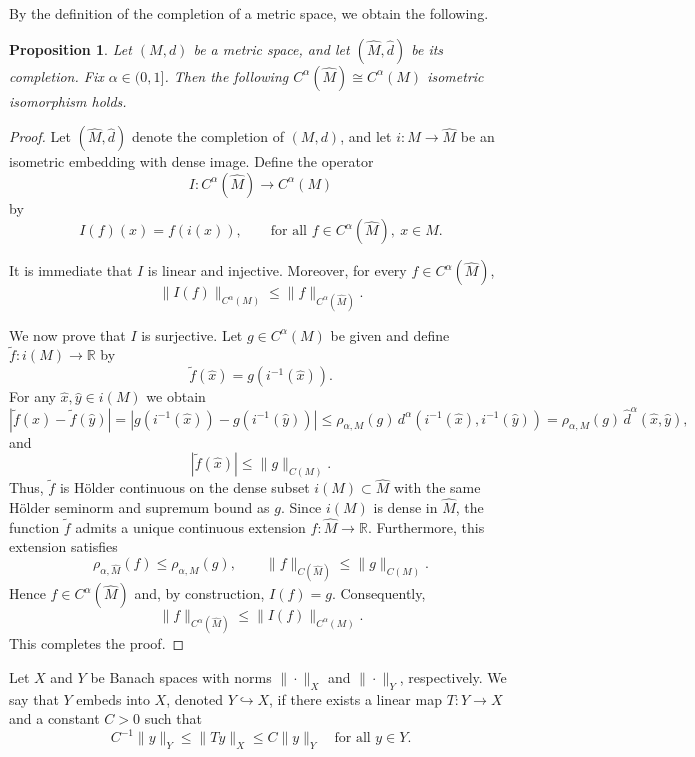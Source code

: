 \documentclass[11pt, reqno]{amsart}
\newtheorem{prop}[thm]{Proposition}
\begin{document}
By the definition of the completion of a metric space, we obtain the following.
\begin{prop} \label{iso}
    Let $(M,d)$ be a metric space, and let $(\widehat{M},\widehat{d})$ be its completion. Fix $\alpha \in (0,1]$. Then the following $C^\alpha(\widehat{M}) \cong C^\alpha(M)$ isometric isomorphism holds.
\end{prop}
\begin{proof}
Let $(\widehat{M},\widehat{d})$ denote the completion of $(M,d)$, and let 
$i: M \to \widehat{M}$ be an isometric embedding with dense image. 
Define the operator
\[
I: C^{\alpha}(\widehat{M}) \to C^{\alpha}(M)
\]
by
\[
I(f)(x) = f(i(x)), \qquad \text{for all } f \in C^{\alpha}(\widehat{M}),\ x \in M.
\]

It is immediate that $I$ is linear and injective. Moreover, for every 
$f \in C^{\alpha}(\widehat{M})$,
\[
\|I(f)\|_{C^{\alpha}(M)} \le \|f\|_{C^{\alpha}(\widehat{M})}.
\]

We now prove that $I$ is surjective. Let $g \in C^{\alpha}(M)$ be given and define 
$\widetilde{f}: i(M) \to \mathbb{R}$ by
\[
\widetilde{f}(\hat{x}) = g(i^{-1}(\hat{x})).
\]
For any $\hat{x}, \hat{y} \in i(M)$ we obtain
\[
|\widetilde{f}(\hat{x}) - \widetilde{f}(\hat{y})|
= |g(i^{-1}(\hat{x})) - g(i^{-1}(\hat{y}))|
\le \rho_{\alpha,M}(g)\,d^{\alpha}(i^{-1}(\hat{x}),i^{-1}(\hat{y}))
=\rho_{\alpha,M}(g)\,\widehat{d} ^{\alpha}(\hat{x},\hat{y}),
\]
and
\[
|\widetilde{f}(\hat{x})| \le \|g\|_{C(M)}.
\]
Thus, $\widetilde{f}$ is Hölder continuous on the dense subset 
$i(M) \subset \widehat{M}$ with the same Hölder seminorm and supremum bound as $g$.
Since $i(M)$ is dense in $\widehat{M}$, the function $\widetilde{f}$ admits 
a unique continuous extension $f: \widehat{M} \to \mathbb{R}$. 
Furthermore, this extension satisfies
\[
\rho_{\alpha,\widehat{M}}(f) \le \rho_{\alpha,M}(g),
\qquad
\|f\|_{C(\widehat{M})} \le \|g\|_{C(M)}.
\]
Hence $f \in C^{\alpha}(\widehat{M})$ and, by construction, $I(f)=g$. 
Consequently,
\[
\|f\|_{C^{\alpha}(\widehat{M})}
\le
\|I(f)\|_{C^{\alpha}(M)}.
\]
This completes the proof.
\end{proof}
















Let \(X\) and \(Y\) be Banach spaces with norms \(\|\cdot\|_X\) and \(\|\cdot\|_Y\), respectively. 
We say that \(Y\) embeds into \(X\), denoted \(Y \hookrightarrow X\), if there exists a linear map 
\(T: Y \to X\) and a constant \(C > 0\) such that
\[
C^{-1} \|y\|_Y \leq \|Ty\|_X \leq C \|y\|_Y \quad \text{for all } y \in Y.
\]
\end{document}
